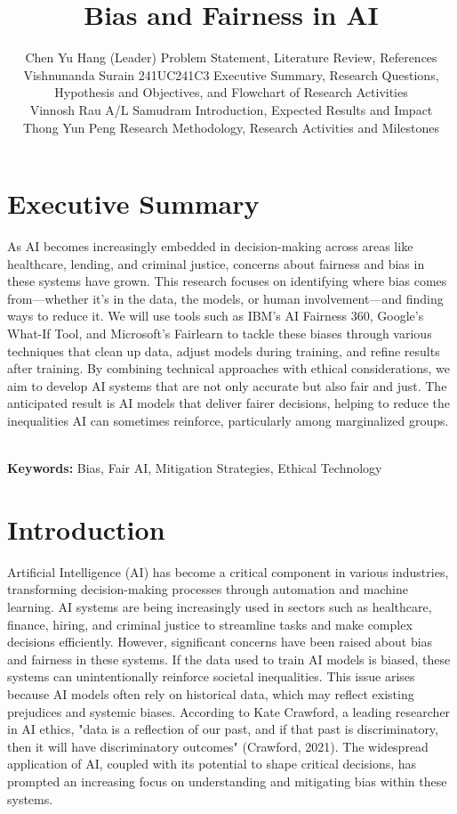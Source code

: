 \documentclass[a4paper, 12pt]{article}
\author{
Chen Yu Hang (Leader) \quad 1211107973 \quad Problem Statement, Literature Review, References \\
Vishnunanda Surain \quad 241UC241C3 \quad Executive Summary, Research Questions, \\Hypothesis and 
Objectives, and Flowchart of Research Activities\\
Vinnosh Rau A/L Samudram \quad 1211108264 \quad Introduction, 
Expected Results and Impact\\   
Thong Yun Peng \quad 1211107295 \quad Research Methodology, Research Activities and Milestones\\
}
\title{Bias and Fairness in AI}
\begin{document}
\maketitle

\section*{Executive Summary}


As AI becomes increasingly embedded in decision-making across areas like healthcare, lending, and criminal justice, concerns about fairness and bias in these systems have grown. This research focuses on identifying where bias comes from—whether it's in the data, the models, or human involvement—and finding ways to reduce it. We will use tools such as IBM's AI Fairness 360, Google’s What-If Tool, and Microsoft’s Fairlearn to tackle these biases through various techniques that clean up data, adjust models during training, and refine results after training. By combining technical approaches with ethical considerations, we aim to develop AI systems that are not only accurate but also fair and just. The anticipated result is AI models that deliver fairer decisions, helping to reduce the inequalities AI can sometimes reinforce, particularly among marginalized groups.


 
\hfill
\\
\textbf{Keywords:} Bias, Fair AI, Mitigation Strategies, Ethical Technology \\

\section{Introduction}
Artificial Intelligence (AI) has become a critical component in various industries, transforming decision-making processes through automation and machine learning. AI systems are being increasingly used in sectors such as healthcare, finance, hiring, and criminal justice to streamline tasks and make complex decisions efficiently. However, significant concerns have been raised about bias and fairness in these systems. If the data used to train AI models is biased, these systems can unintentionally reinforce societal inequalities. This issue arises because AI models often rely on historical data, which may reflect existing prejudices and systemic biases. According to Kate Crawford, a leading researcher in AI ethics, "data is a reflection of our past, and if that past is discriminatory, then it will have discriminatory outcomes" (Crawford, 2021). The widespread application of AI, coupled with its potential to shape critical decisions, has prompted an increasing focus on understanding and mitigating bias within these systems.
\end{document}
